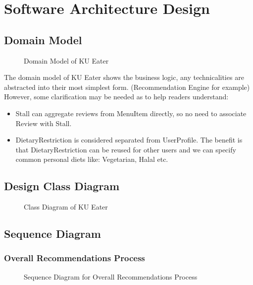 \chapter{Software Architecture Design}
\label{chap:software-architecture-design}

\section{Domain Model}
\label{section:domain-model}

\begin{figure}[h!]
    \centering
    
    \caption{Domain Model of KU Eater}
\end{figure}

The domain model of KU Eater shows the business logic, any technicalities are abstracted into their most simplest form. (Recommendation Engine for example)
However, some clarification may be needed as to help readers understand:

\begin{itemize}
    \item Stall can aggregate reviews from MenuItem directly, so no need to associate Review with Stall.
    \item DietaryRestriction is considered separated from UserProfile. The benefit is that DietaryRestriction can be reused for other users
    and we can specify common personal diets like: Vegetarian, Halal etc.
\end{itemize}

\section{Design Class Diagram}
\label{section:design-class-diagram}

\begin{figure}[h!]
    \centering
    
    \caption{Class Diagram of KU Eater}
\end{figure}

\section{Sequence Diagram}
\label{section:sequence-diagram}

\subsection{Overall Recommendations Process}
\begin{figure}[h!]
    \centering
    
    \caption{Sequence Diagram for Overall Recommendations Process}
\end{figure}

